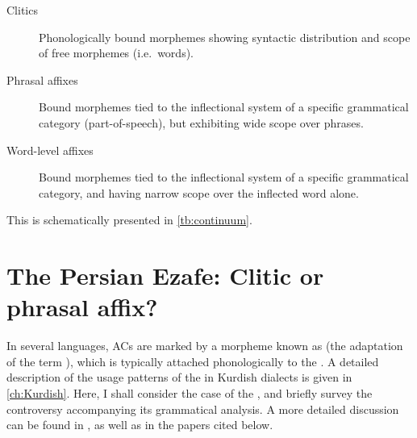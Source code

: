 \begin{description}

\item[Clitics] Phonologically bound morphemes showing syntactic distribution and \linebreak scope of free morphemes (i.e.\ words).

\item[Phrasal affixes] Bound morphemes tied to the inflectional system of a specific grammatical category (part-of-speech), but exhibiting wide scope over \linebreak phrases.

\item[Word-level affixes] Bound morphemes tied to the inflectional system of a specific grammatical category, and having narrow scope over the inflected word alone.

\end{description}

This is schematically presented  in \vref{tb:continuum}.

\begin{table}[h!t]
\caption{The Affix--Clitic Continuum} \label{tb:continuum}
\end{table}

\section{The Persian Ezafe: Clitic or phrasal affix?} \label{ss:ezafe_dispute}

In several  languages, ACs are marked by a morpheme known as \ez* (the  adaptation of the  term ), which is typically attached phonologically to the \prim. A detailed description of the usage patterns of the \ez* in Kurdish dialects is given in \cref{ch:Kurdish}. Here, I shall consider the case of the \Per \ez*, and briefly survey the controversy accompanying its grammatical analysis. A more detailed discussion can be found in \citet[\S 3.1]{HaigLinker}, as well as in the papers cited below.

